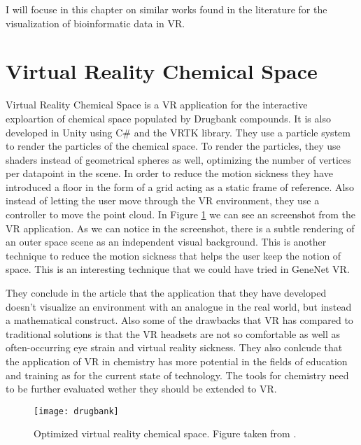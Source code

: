 I will focuse in this chapter on similar works found in the literature for the visualization of bioinformatic data in VR.

\section{Virtual Reality Chemical Space}
Virtual Reality Chemical Space is a VR application for the interactive exploartion of chemical space populated by Drugbank compounds\cite{drugbank}. It is also developed in Unity using C\# and the VRTK library. They use a particle system to render the particles of the chemical space. To render the particles, they use shaders instead of geometrical spheres as well, optimizing the number of vertices per datapoint in the scene. In order to reduce the motion sickness they have introduced a floor in the form of a grid acting as a static frame of reference. Also instead of letting the user move through the VR environment, they use a controller to move the point cloud. In Figure \ref{fig:drugbank} we can see an screenshot from the VR application. As we can notice in the screenshot, there is a subtle rendering of an outer space scene as an independent visual background. This is another technique to reduce the motion sickness that helps the user keep the notion of space. This is an interesting technique that we could have tried in GeneNet VR.

They conclude in the article that the application that they have developed doesn't visualize an environment with an analogue in the real world, but instead a mathematical construct. Also some of the drawbacks that VR has compared to traditional solutions is that the VR headsets are not so comfortable as well as often-occurring eye strain and virtual reality sickness. They also conlcude that the application of VR in chemistry has more potential in the fields of education and training as for the current state of technology. The tools for chemistry need to be further evaluated wether they should be extended to VR.

\begin{figure}[h!]
    \centering%
    \texttt{[image: drugbank]}
    \caption{Optimized virtual reality chemical space. Figure taken from \cite{drugbank}.}
    \label{fig:drugbank}
\end{figure}%

